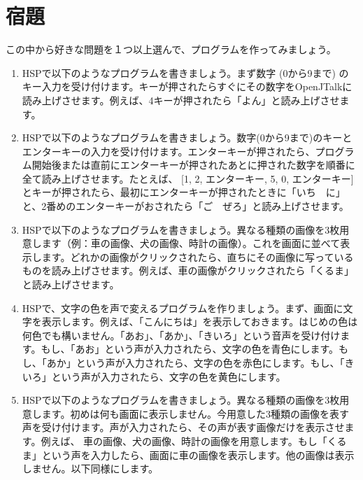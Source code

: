 \section{宿題}
この中から好きな問題を１つ以上選んで、プログラムを作ってみましょう。
\begin{enumerate}
\item HSPで以下のようなプログラムを書きましょう。まず数字 (0から9まで) のキー入力を受け付けます。キーが押されたらすぐにその数字をOpenJTalkに読み上げさせます。例えば、4キーが押されたら「よん」と読み上げさせます。
\item HSPで以下のようなプログラムを書きましょう。数字(0から9まで)のキーとエンターキーの入力を受け付けます。エンターキーが押されたら、プログラム開始後または直前にエンターキーが押されたあとに押された数字を順番に全て読み上げさせます。たとえば、 [1, 2, エンターキー, 5, 0, エンターキー]とキーが押されたら、最初にエンターキーが押されたときに「いち　に」と、2番めのエンターキーがおされたら「ご　ぜろ」と読み上げさせます。
\item HSPで以下のようなプログラムを書きましょう。異なる種類の画像を3枚用意します（例：車の画像、犬の画像、時計の画像）。これを画面に並べて表示します。どれかの画像がクリックされたら、直ちにその画像に写っているものを読み上げさせます。例えば、車の画像がクリックされたら「くるま」と読み上げさせます。
\item HSPで、文字の色を声で変えるプログラムを作りましょう。まず、画面に文字を表示します。例えば、「こんにちは」を表示しておきます。はじめの色は何色でも構いません。「あお」、「あか」、「きいろ」という音声を受け付けます。もし、「あお」という声が入力されたら、文字の色を青色にします。もし、「あか」という声が入力されたら、文字の色を赤色にします。もし、「きいろ」という声が入力されたら、文字の色を黄色にします。
\item HSPで以下のようなプログラムを書きましょう。異なる種類の画像を3枚用意します。初めは何も画面に表示しません。今用意した3種類の画像を表す声を受け付けます。声が入力されたら、その声が表す画像だけを表示させます。例えば、 車の画像、犬の画像、時計の画像を用意します。もし「くるま」という声を入力したら、画面に車の画像を表示します。他の画像は表示しません。以下同様にします。
\end{enumerate}